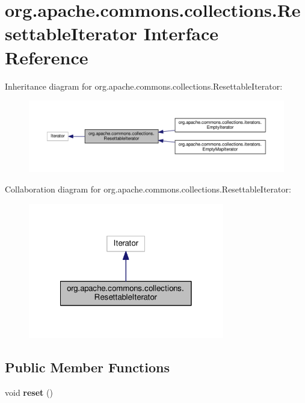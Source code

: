 \section{org.\-apache.\-commons.\-collections.\-Resettable\-Iterator Interface Reference}
\label{interfaceorg_1_1apache_1_1commons_1_1collections_1_1_resettable_iterator}


Inheritance diagram for org.\-apache.\-commons.\-collections.\-Resettable\-Iterator\-:
\nopagebreak
\begin{figure}[H]
\begin{center}
\leavevmode
\includegraphics[width=350pt]{interfaceorg_1_1apache_1_1commons_1_1collections_1_1_resettable_iterator__inherit__graph}
\end{center}
\end{figure}


Collaboration diagram for org.\-apache.\-commons.\-collections.\-Resettable\-Iterator\-:
\nopagebreak
\begin{figure}[H]
\begin{center}
\leavevmode
\includegraphics[width=242pt]{interfaceorg_1_1apache_1_1commons_1_1collections_1_1_resettable_iterator__coll__graph}
\end{center}
\end{figure}
\subsection*{Public Member Functions}
\begin{DoxyCompactItemize}
\item 
void {\bf reset} ()
\end{DoxyCompactItemize}



